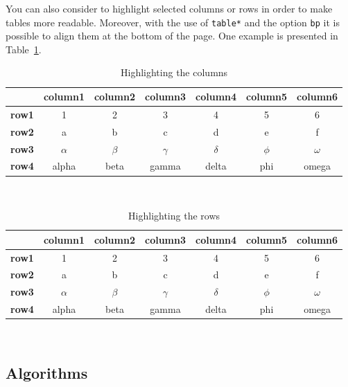 \documentclass{Configuration_Files/PoliMi3i_thesis}
\begin{document}
You can also consider to highlight selected columns or rows in order to make tables more readable.
Moreover, with the use of \texttt{table*} and the option \texttt{bp} it is possible to align them at the bottom of
the page.
One example is presented in Table~\ref{table:exampleC}.

\begin{table}[H]
\centering
\begin{tabular}{|p{3em} | c | c | c | c | c | c|}
\hline
& \textbf{column1} & \textbf{column2} & \textbf{column3} & \textbf{column4} & \textbf{column5} & \textbf{column6} \T\B \\
\hline \hline
\textbf{row1} & 1 & 2 & 3 & 4 & 5 & 6 \T\B\\
\textbf{row2} & a & b & c & d & e & f \T\B\\
\textbf{row3} & $\alpha$ & $\beta$ & $\gamma$ & $\delta$ & $\phi$ & $\omega$ \T\B\\
\textbf{row4} & alpha & beta & gamma & delta & phi & omega \B\\
\hline
\end{tabular}
\\[10pt]
\caption{Highlighting the columns}
\label{table:exampleC}
\end{table}

\begin{table}[H]
\centering
\begin{tabular}{|p{3em} c c c c c c|}
\hline
& \textbf{column1} & \textbf{column2} & \textbf{column3} & \textbf{column4} & \textbf{column5} & \textbf{column6} \T\B \\
\hline \hline
\textbf{row1} & 1 & 2 & 3 & 4 & 5 & 6 \T\B\\
\hline
\textbf{row2} & a & b & c & d & e & f \T\B\\
\hline
\textbf{row3} & $\alpha$ & $\beta$ & $\gamma$ & $\delta$ & $\phi$ & $\omega$ \T\B\\
\hline
\textbf{row4} & alpha & beta & gamma & delta & phi & omega \B\\
\hline
\end{tabular}
\\[10pt]
\caption{Highlighting the rows}
\label{table:exampleR}
\end{table}

\subsection{Algorithms}
\label{subsec:algorithms}
\end{document}
